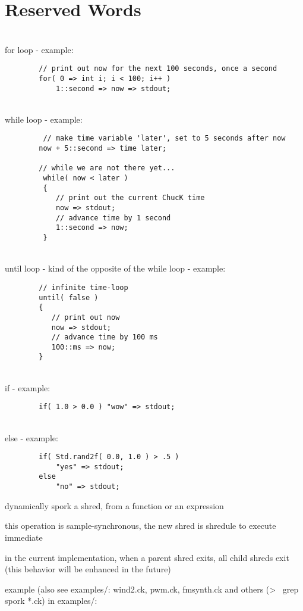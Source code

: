 \chapter{Reserved Words}


\\
for loop - example:

\begin{verbatim}
        // print out now for the next 100 seconds, once a second
        for( 0 => int i; i < 100; i++ )
            1::second => now => stdout;
\end{verbatim}

\\
while loop - example:
\begin{verbatim}
         // make time variable 'later', set to 5 seconds after now
        now + 5::second => time later;
   
        // while we are not there yet...
         while( now < later )
         {
            // print out the current ChucK time
            now => stdout;
            // advance time by 1 second
            1::second => now;
         }
\end{verbatim}

\\
until loop - kind of the opposite of the while loop - example:
\begin{verbatim}
        // infinite time-loop
        until( false )
        {
           // print out now
           now => stdout;
           // advance time by 100 ms
           100::ms => now;
        }
\end{verbatim}

\\
if - example:
\begin{verbatim}
        if( 1.0 > 0.0 ) "wow" => stdout;
\end{verbatim}

\\
else - example:
\begin{verbatim}
        if( Std.rand2f( 0.0, 1.0 ) > .5 )
            "yes" => stdout;
        else
            "no" => stdout;
\end{verbatim}

\begin{chuckitemize}
\item dynamically spork a shred, from a function or an expression
\item this operation is sample-synchronous, the new shred is shredule to execute immediate
\item in the current implementation, when a parent shred exits, all child shreds exit (this behavior will be enhanced in the future)
\item example (also see examples/: wind2.ck, pwm.ck, fmsynth.ck and others (\textgreater~ grep spork *.ck) in examples/:
\end{chuckitemize}

